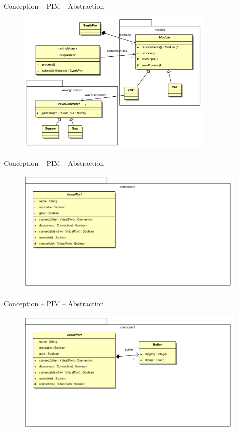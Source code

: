 \documentclass[frenchb]{beamer}
\begin{document}
\begin{frame}{Conception -- PIM -- Abstraction}
    \begin{figure}
        \includegraphics[height=7cm ]{../img/ps/business-pim-part1-4.pdf}
    \end{figure}
\end{frame}

\begin{frame}{Conception -- PIM -- Abstraction}
    \begin{figure}
        \includegraphics[width=12cm ]{../img/ps/business-pim-part2-1.pdf}
    \end{figure}
\end{frame}

\begin{frame}{Conception -- PIM -- Abstraction}
    \begin{figure}
        \includegraphics[width=12cm ]{../img/ps/business-pim-part2-2.pdf}
    \end{figure}
\end{frame}
\end{document}

